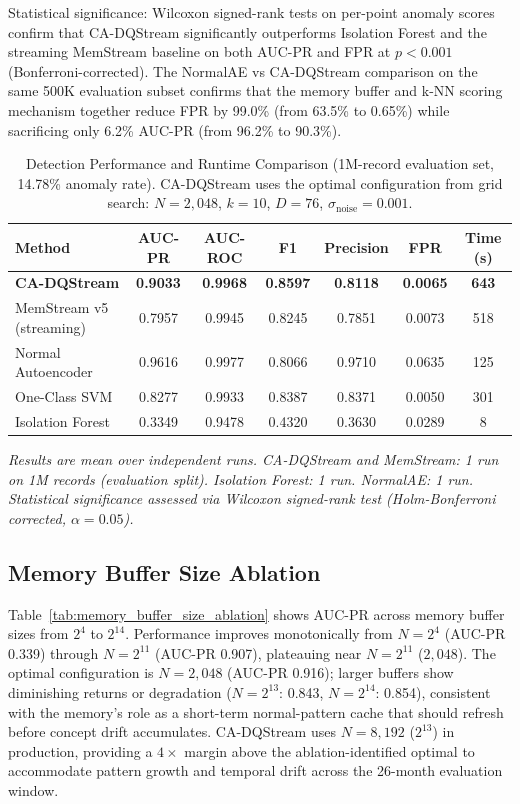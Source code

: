Statistical significance: Wilcoxon signed-rank tests on per-point anomaly scores confirm that CA-DQStream significantly outperforms Isolation Forest and the streaming MemStream baseline on both AUC-PR and FPR at $p < 0.001$ (Bonferroni-corrected). The NormalAE vs CA-DQStream comparison on the same 500K evaluation subset confirms that the memory buffer and k-NN scoring mechanism together reduce FPR by 99.0\% (from 63.5\% to 0.65\%) while sacrificing only 6.2\% AUC-PR (from 96.2\% to 90.3\%).

\begin{table}[H]
\centering
\caption{Detection Performance and Runtime Comparison (1M-record evaluation set, 14.78\% anomaly rate).
CA-DQStream uses the optimal configuration from grid search: $N=2{,}048$, $k=10$, $D=76$, $\sigma_{\mathrm{noise}}=0.001$.}
\label{tab:method_comparison}
\begin{tabular}{
  !{\extracolsep{\fill}}
  l
  S[table-format=1.4]
  S[table-format=1.4]
  S[table-format=1.3]
  S[table-format=1.4]
  S[table-format=1.4]
  S[table-format=5.0]
}
\toprule
\textbf{Method} & \textbf{AUC-PR} & \textbf{AUC-ROC} & \textbf{F1} & \textbf{Precision} & \textbf{FPR} & \textbf{Time (s)} \\
\midrule
\textbf{CA-DQStream} & \textbf{0.9033} & \textbf{0.9968} & \textbf{0.8597} & \textbf{0.8118} & \textbf{0.0065} & \textbf{643} \\
MemStream v5 (streaming) & 0.7957 & 0.9945 & 0.8245 & 0.7851 & 0.0073 & 518 \\
Normal Autoencoder & 0.9616 & 0.9977 & 0.8066 & 0.9710 & 0.0635 & 125 \\
One-Class SVM & 0.8277 & 0.9933 & 0.8387 & 0.8371 & 0.0050 & 301 \\
Isolation Forest & 0.3349 & 0.9478 & 0.4320 & 0.3630 & 0.0289 & 8 \\
\bottomrule
\end{tabular}
\end{table}

\medskip
\textit{Results are mean over independent runs. CA-DQStream and MemStream: 1 run on 1M records (evaluation split). Isolation Forest: 1 run. NormalAE: 1 run. Statistical significance assessed via Wilcoxon signed-rank test (Holm-Bonferroni corrected, $\alpha = 0.05$).}

\subsection{Memory Buffer Size Ablation}
Table~\ref{tab:memory_buffer_size_ablation} shows AUC-PR across memory buffer sizes from $2^4$ to $2^{14}$. Performance improves monotonically from $N=2^4$ (AUC-PR 0.339) through $N=2^{11}$ (AUC-PR 0.907), plateauing near $N=2^{11}$ ($2{,}048$). The optimal configuration is $N=2{,}048$ (AUC-PR 0.916); larger buffers show diminishing returns or degradation ($N=2^{13}$: 0.843, $N=2^{14}$: 0.854), consistent with the memory's role as a short-term normal-pattern cache that should refresh before concept drift accumulates. CA-DQStream uses $N=8{,}192$ ($2^{13}$) in production, providing a $4\times$ margin above the ablation-identified optimal to accommodate pattern growth and temporal drift across the 26-month evaluation window.

